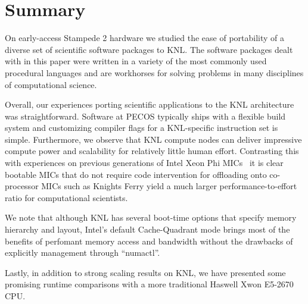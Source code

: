 \section{Summary}
\label{sec:summary}

On early-access Stampede 2 hardware we studied the ease of portability of a
diverse set of scientific software packages to KNL.  The software packages
dealt with in this paper were written in a variety of the most commonly used
procedural languages and are workhorses for solving problems in many
disciplines of computational science.

Overall, our experiences porting scientific applications to the KNL
architecture was straightforward.  Software at PECOS typically ships with a
flexible build system and customizing compiler flags for a KNL-specific
instruction set is simple.  Furthermore, we observe that KNL compute nodes can
deliver impressive compute power and scalability for relatively little human
effort.  Contrasting this with experiences on previous generations of Intel
Xeon Phi MICs~\cite{schulz2012early} it is clear bootable MICs that do not
require code intervention for offloading onto co-processor MICs such as Knights
Ferry yield a much larger performance-to-effort ratio for computational
scientists.

We note that although KNL has several boot-time options that specify memory
hierarchy and layout, Intel's default Cache-Quadrant mode brings most of the
benefits of perfomant memory access and bandwidth without the drawbacks of
explicitly management through ``numactl''.

Lastly, in addition to strong scaling results on KNL, we have presented some
promising runtime comparisons with a more traditional Haswell Xwon E5-2670 CPU.

